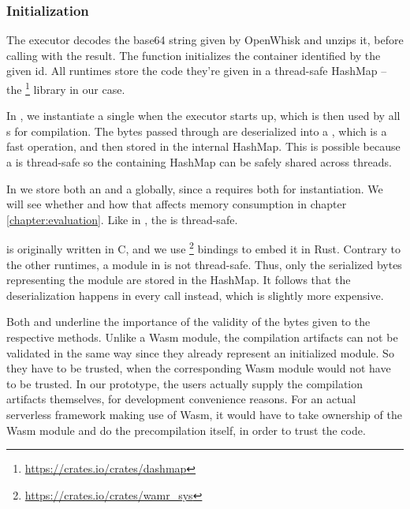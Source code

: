 \subsubsection{Initialization}
The executor decodes the base64 string given by OpenWhisk and unzips it, before calling  with the result. The function initializes the container identified by the given id. All runtimes store the code they're given in a thread-safe HashMap -- the  \footnote{\url{https://crates.io/crates/dashmap}} library in our case.

\begin{description}[style=multiline, leftmargin=2.5cm, font=\bfseries]

    \item[Wasmtime] In , we instantiate a single  when the executor starts up, which is then used by all s for compilation. The bytes passed through  are deserialized into a , which is a fast operation, and then stored in the internal HashMap. This is possible because a  is thread-safe so the containing HashMap can be safely shared across threads.

    \item[Wasmer] In  we store both an  and a  globally, since a  requires both for instantiation. We will see whether and how that affects memory consumption in chapter \ref{chapter:evaluation}. Like in , the  is thread-safe.

    \item[Wamr]  is originally written in C, and we use  \footnote{\url{https://crates.io/crates/wamr\_sys}} bindings to embed it in Rust. Contrary to the other runtimes, a module in  is not thread-safe. Thus, only the serialized bytes representing the module are stored in the HashMap. It follows that the deserialization happens in every  call instead, which is slightly more expensive.

\end{description}

Both  and  underline the importance of the validity of the bytes given to the respective  methods. Unlike a Wasm module, the compilation artifacts can not be validated in the same way since they already represent an initialized module. So they have to be trusted, when the corresponding Wasm module would not have to be trusted. In our prototype, the users actually supply the compilation artifacts themselves, for development convenience reasons. For an actual serverless framework making use of Wasm, it would have to take ownership of the Wasm module and do the precompilation itself, in order to trust the code.

